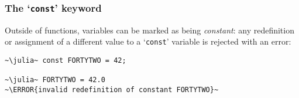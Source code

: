 \documentclass[english,serif,mathserif,xcolor=pdftex,dvipsnames,table]{beamer}
\begin{document}
\begin{frame}[fragile]
  \frametitle{The `\texttt{const}' keyword}
  Outside of functions, variables can be marked as being
  \emph{constant}: any redefinition or assignment of a different value
  to a `\texttt{const}' variable is rejected with an error:
  \begin{lstlisting}
~\julia~ const FORTYTWO = 42;

~\julia~ FORTYTWO = 42.0
~\ERROR{invalid redefinition of constant FORTYTWO}~
  \end{lstlisting}
\end{frame}
\end{document}
